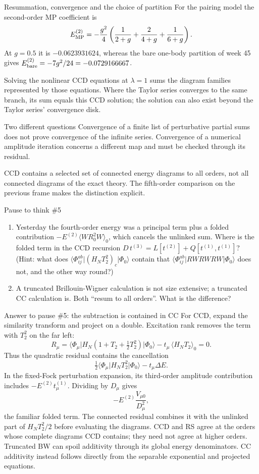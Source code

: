 \documentclass[aspectratio=169,10pt]{beamer}
\newcounter{thinkctr}
\newcommand{\thinkq}[2]{%
  \stepcounter{thinkctr}%
  \vfill
  \begin{tcolorbox}[enhanced,colback=palewarm,colframe=warm,boxrule=1.2pt,arc=4pt,
    grow to left by=6mm,grow to right by=6mm,
    left=16pt,right=16pt,top=16pt,bottom=18pt,
    fonttitle=\bfseries\Large,fontupper=\Large,
    title={Pause to think \#\thethinkctr\hfill\mdseries\normalsize(about #1 min -- discuss with your neighbour)}]
  #2
  \end{tcolorbox}
  \vfill}
\newcommand{\mel}[3]{\langle #1\lvert #2\rvert #3\rangle}
\newcommand{\av}[1]{\langle #1\rangle_0}
\newcommand{\ph}{\Phi_0}
\begin{document}
\begin{frame}{Resummation, convergence and the choice of partition}
\small
For the pairing model the second-order MP coefficient is
\[
 E_{\rm MP}^{(2)}=-\frac{g^2}{4}\left(\frac1{2+g}+\frac2{4+g}+\frac1{6+g}\right).
\]
At $g=0.5$ it is $-0.0623931624$, whereas the bare one-body partition of week 45 gives $E_{\rm bare}^{(2)}=-7g^2/24=-0.0729166667$.
\medskip

Solving the nonlinear CCD equations at $\lambda=1$ sums the diagram families represented by those equations. Where the Taylor series converges to the same branch, its sum equals this CCD solution; the solution can also exist beyond the Taylor series' convergence disk.
\begin{block}{Two different questions}
Convergence of a finite list of perturbative partial sums does not prove convergence of the infinite series. Convergence of a numerical amplitude iteration concerns a different map and must be checked through its residual.
\end{block}
CCD contains a selected set of connected energy diagrams to all orders, not all connected diagrams of the exact theory. The fifth-order comparison on the previous frame makes the distinction explicit.
\end{frame}


\begin{frame}{Pause to think \#5}
\thinkq{3}{
\begin{enumerate}
\item Yesterday the fourth-order energy was a principal term plus a folded contribution $-E^{(2)}\av{WR_0^2W}$, which cancels the unlinked sum. Where is the folded term in the CCD recursion $D\,t^{(3)}=L[t^{(2)}]+Q[t^{(1)},t^{(1)}]$? (Hint: what does $\mel{\Phi_{ij}^{ab}}{(H_NT_2^2)_c}{\ph}$ contain that $\langle\Phi_{ij}^{ab}|RWRWRW|\ph\rangle$ does not, and the other way round?)
\item A truncated Brillouin-Wigner calculation is not size extensive; a truncated CC calculation is. Both ``resum to all orders''. What is the difference?
\end{enumerate}}
\end{frame}

\begin{frame}{Answer to pause \#5: the subtraction is contained in CC}
For CCD, expand the similarity transform and project on a double. Excitation rank removes the term with $T_2^2$ on the far left:
\[
 R_\mu=\mel{\Phi_\mu}{H_N(1+T_2+\tfrac12T_2^2)}{\ph}
 -t_\mu\,\av{H_NT_2}=0.
\]
Thus the quadratic residual contains the cancellation
\[
 \tfrac12\mel{\Phi_\mu}{H_NT_2^2}{\ph}-t_\mu\Delta E.
\]
In the fixed-Fock perturbation expansion, its third-order amplitude contribution includes $-E^{(2)}t_\mu^{(1)}$. Dividing by $D_\mu$ gives
\[
 -E^{(2)}\frac{V_{\mu0}}{D_\mu^2},
\]
the familiar folded term. The connected residual combines it with the unlinked part of $H_NT_2^2/2$ before evaluating the diagrams.
\small CCD and RS agree at the orders whose complete diagrams CCD contains; they need not agree at higher orders. Truncated BW can spoil additivity through its global energy denominators. CC additivity instead follows directly from the separable exponential and projected equations.
\end{frame}
\end{document}
